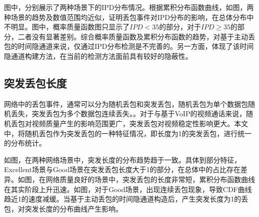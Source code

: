 图中，分别展示了两种场景下的IPD分布情况。根据累积分布函数曲线，如图，两种场景的趋势及数值范围均近似，证明丢包事件对IPD分布的影响，在总体分布中不明显。图中，概率质量函数图只显示了$IPD<35$的部分，对于$IPD \geq 35$的部分，二者没有显著差别。综合概率质量函数及累积分布函数的趋势，对基于主动丢包的时间隐通道来说，仅通过IPD分布检测是不完善的。另一方面，体现了该时间隐通道构建方法，在当前的检测方法面前具有较好的隐蔽性。

\subsection{突发丢包长度}
\label{chap:analyze:results:burst}

网络中的丢包事件，通常可以分为随机丢包和突发丢包，随机丢包为单个数据包随机丢失，突发丢包为多个数据包连续丢失。。对于与基于VoIP的视频通话来说，随机丢包对视频质量产生的影响范围更广，突发丢包对视频稳定性影响更大。本文中，将随机丢包作为突发丢包的一种特征情况，即长度为1的突发丢包，进行统一的分布统计。


如图，在两种网络场景中，突发长度的分布趋势趋于一致。具体到部分特征，Excellent场景与Good场景在突发丢包长度大于1的部分，在总体中的占比存在差异。如图，在网络质量良好的场景中，突发丢包的长度非常短，累积分布函数曲线在其实阶段上升迅速。如图，对于Good场景，出现连续丢包现象，导致CDF曲线趋近1的速度减缓。当基于主动丢包的时间隐通道构造后，产生突发长度为1的丢包，对突发长度的分布曲线产生影响。